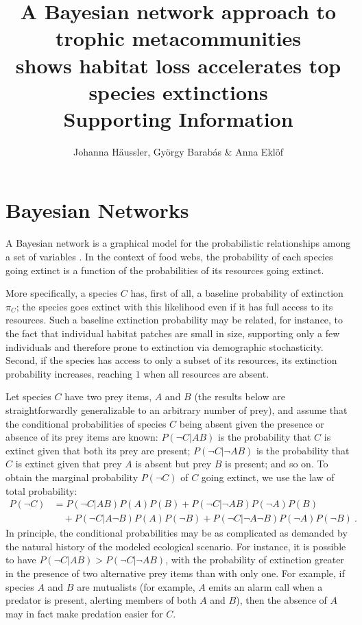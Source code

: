 \documentclass[11pt]{article}
\title{A Bayesian network approach to trophic metacommunities\\shows habitat loss accelerates top species extinctions\\ \medskip Supporting Information}
\author{Johanna H\"aussler, Gy\"orgy Barab\'as \& Anna Ekl\"of}
\date{}
\begin{document}
\maketitle


\section{Bayesian Networks} 
\label{sec:BN}

A Bayesian network is a graphical model for the probabilistic relationships among a set of variables \citep{Jensen1996, Eklofetal2013MEE}. In the context of food webs, the probability of each species going extinct is a function of the probabilities of its resources going extinct.

More specifically, a species $C$ has, first of all, a baseline probability of extinction $\pi_C$; the species goes extinct with this likelihood even if it has full access to its resources. Such a baseline extinction probability may be related, for instance, to the fact that individual habitat patches are small in size, supporting only a few individuals and therefore prone to extinction via demographic stochasticity. Second, if the species has access to only a subset of its resources, its extinction probability increases, reaching $1$ when all resources are absent.

Let species $C$ have two prey items, $A$ and $B$ (the results below are straightforwardly generalizable to an arbitrary number of prey), and assume that the conditional probabilities of species $C$ being absent given the presence or absence of its prey items are known: $P(\neg C|A B)$ is the probability that $C$ is extinct given that both its prey are present; $P(\neg C|\neg A B)$ is the probability that $C$ is extinct given that prey $A$ is absent but prey $B$ is present; and so on. To obtain the marginal probability $P(\neg C)$ of $C$ going extinct, we use the law of total probability:
\begin{equation}
  \label{eq:BN_marginal_example}
  \begin{split}
    P(\neg C) &= P(\neg C|A B)P(A)P(B) + P(\neg C|\neg A B)P(\neg A)P(B)
    \\ &\quad + P(\neg C|A \neg B)P(A)P(\neg B) + P(\neg C|\neg A \neg B)
    P(\neg A)P(\neg B) \ .
  \end{split}
\end{equation}
In principle, the conditional probabilities may be as complicated as demanded by the natural history of the modeled ecological scenario. For instance, it is possible to have $P(\neg C|A B) > P(\neg C| \neg A B)$, with the probability of extinction greater in the presence of two alternative prey items than with only one. For example, if species $A$ and $B$ are mutualists (for example, $A$ emits an alarm call when a predator is present, alerting members of both $A$ and $B$), then the absence of $A$ may in fact make predation easier for $C$.
\end{document}

